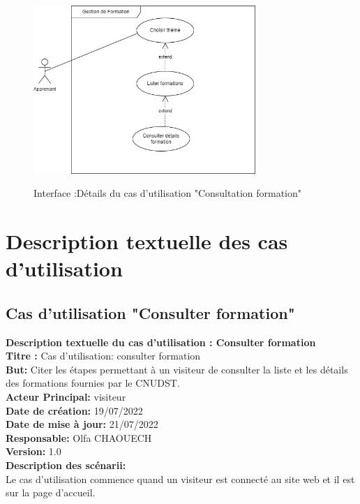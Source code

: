 \begin{itemize}
\begin{figure}[!h]
	\centering
	{\includegraphics[width=0.75\textwidth]{D) IMAGES/detail2.png}}
	\caption{Interface :Détails du cas d'utilisation "Consultation formation" }
	\label{Org}
\end{figure}
\end{itemize}
\section{Description textuelle des cas d'utilisation}
\subsection{Cas d'utilisation "Consulter formation"}
\textbf{Description textuelle du cas d'utilisation : Consulter formation}\\
\textbf{Titre :} Cas d'utilisation: consulter formation\\
\textbf{But:} Citer les étapes permettant à un visiteur de consulter la liste et les détails des formations fournies par le CNUDST.\\
\textbf{Acteur Principal:} visiteur\\
\textbf{Date de création:} 19/07/2022\\
\textbf{Date de mise à jour:} 21/07/2022\\
\textbf{Responsable:} Olfa CHAOUECH\\
\textbf{Version:} 1.0\\
\textbf{Description des scénarii:}\\
Le cas d'utilisation commence quand un visiteur est connecté au site web et il est sur la page d'accueil.


